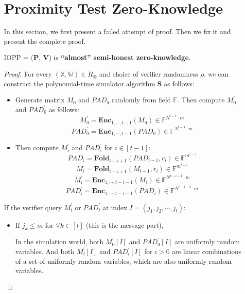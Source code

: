 \section{Proximity Test Zero-Knowledge}

In this section, we first present a failed attempt of proof. Then we fix it and present the complete proof.

\begin{lemma}
\label{lemma:szkpc-zk}

IOPP = ($\textbf{P}$, $\textbf{V}$) is \textbf{``almost'' semi-honest zero-knowledge}.

\end{lemma}
\begin{proof}

For every $(\mathbb{X}, \mathbb{W}) \in R_\otimes$ and choice of verifier randomness $\rho$, we can construct the polynomial-time simulator algorithm $\textbf{S}$ as follows:


\begin{itemize}
    \item Generate matrix $M_0$ and $PAD_0$ randomly from field $\mathbb{F}$. Then compute $M_0^\prime$ and $PAD_0^\prime$ as follows:
    $$
        M_0^{\prime} = \textbf{Enc}_{1,\cdots,t-1}(M_0) \in \mathbb{F}^{N^{t-1} \cdot m}
    $$
    $$
        PAD_0^{\prime} = \textbf{Enc}_{1,\cdots,t-1}(PAD_0) \in \mathbb{F}^{N^{t-1} \cdot m}
    $$
    \item Then compute $M_i^{\prime}$ and $PAD_i^\prime$ for $i \in [t-1]$:
    $$
        PAD_i = \textbf{Fold}_{t-i+1}(PAD_{i-1}, r_i) \in \mathbb{F}^{m^{t-i}}
    $$
    $$
        M_i = \textbf{Fold}_{t-i+1}(M_{i-1}, r_i) \in \mathbb{F}^{m^{t-i}}
    $$
    $$
        M_i^\prime =  \textbf{Enc}_{1, \cdots, t- i - 1}(M_i) \in \mathbb{F}^{N^{t-i-1} \cdot m}
    $$
    $$
        PAD_i^\prime =  \textbf{Enc}_{1, \cdots, t- i - 1}(PAD_i) \in \mathbb{F}^{N^{t-i-1} \cdot m}
    $$
\end{itemize}

If the verifier query $M_i^{\prime}$ or $PAD_i^\prime$ at index $I = (j_1, j_2, \cdots, j_t)$:

\begin{itemize}
    \item If $j_k \le m$ for $\forall k \in [t]$ (this is the message part),
    
    In the simulation world, both $M_0^\prime[I]$ and $PAD_0^\prime[I]$ are uniformly random variables. And both $M_i^\prime[I]$ and $PAD_i^\prime[I]$ for $i > 0$ are linear combinations of a set of uniformly random variables, which are also uniformly random variables.
    

\end{itemize}
\end{proof}
